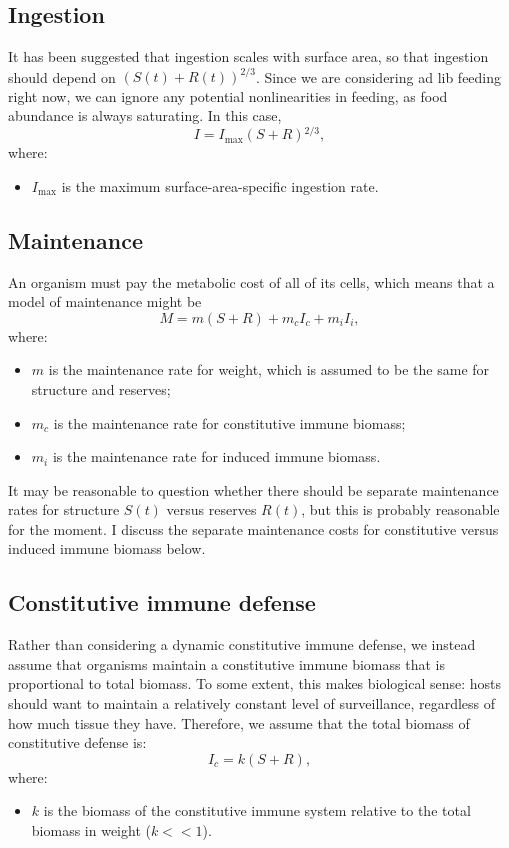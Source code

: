 \documentclass[11pt,reqno,final,pdftex]{amsart}\usepackage[]{graphicx}\usepackage[]{color}
\theoremstyle{plain}
\numberwithin{equation}{part}
\begin{document}
\subsection*{Ingestion}
It has been suggested that ingestion scales with surface area, so that ingestion should depend on $(S(t)+R(t))^{2/3}$. Since we are considering
ad lib feeding right now, we can ignore any potential nonlinearities in feeding, as food abundance is always saturating.
In this case,
\begin{equation}
I=I_{\max }(S+R){}^{2/3},
\end{equation}
where:
\begin{itemize}
\item $I_{\max }$ is the maximum surface-area-specific ingestion rate.
\end{itemize}

\subsection*{Maintenance}
An organism must pay the metabolic cost of all of its cells, which means that a model of maintenance might be
\begin{equation}
M=m(S+R)+m_cI_c+m_iI_i,
\end{equation}
where:
\begin{itemize}
\item $m$ is the maintenance rate for weight, which is assumed to be the same for structure and reserves;
\item $m_c$ is the maintenance rate for constitutive immune biomass;
\item $m_i$ is the maintenance rate for induced immune biomass.
\end{itemize}


It may be reasonable to question whether there should be separate maintenance rates for structure $S(t)$ versus reserves $R(t)$, but this is
probably reasonable for the moment. I discuss the separate maintenance costs for constitutive versus induced immune biomass below.

\subsection*{Constitutive immune defense}
Rather than considering a dynamic constitutive immune defense, we instead assume that organisms maintain a constitutive immune biomass that is proportional to total biomass. To some extent, this makes biological sense: hosts should want to maintain a relatively constant level of surveillance, regardless of how much tissue they have. Therefore, we assume that the total biomass of constitutive defense is:
\begin{equation}
I_c=k(S+R),
\end{equation}
where:
\begin{itemize}
\item $k$ is the biomass of the constitutive immune system relative to the total biomass in weight ($k<<1$).
\end{itemize}
\end{document}
